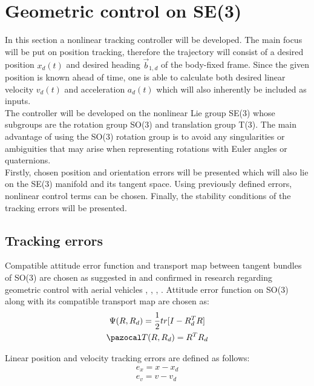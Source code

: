 \section{Geometric control on SE(3)}

In this section a nonlinear tracking controller will be developed. The main focus will be put on position tracking, therefore the trajectory will consist of a desired position $x_d(t)$ and desired heading $\vec{b}_{1,d}$ of the body-fixed frame. Since the given position is known ahead of time, one is able to calculate both desired linear velocity $v_d(t)$ and acceleration $a_d(t)$ which will also inherently be included as inputs. \\
The controller will be developed on the nonlinear Lie group SE(3) whose subgroups are the rotation group SO(3) and translation group T(3). The main advantage of using the SO(3) rotation group is to avoid any singularities or ambiguities that may arise when representing rotations with Euler angles or quaternions. \\
Firstly, chosen position and orientation errors will be presented which will also lie on the SE(3) manifold and its tangent space. Using previously defined errors, nonlinear control terms can be chosen. Finally, the stability conditions of the tracking errors will be presented.

\subsection{Tracking errors}

Compatible attitude error function and transport map between tangent bundles of SO(3) are chosen as suggested in \cite{bulloBook} and confirmed in research regarding geometric control with aerial vehicles \cite{LeeClanak1}, \cite{LeeClanak2}, \cite{LeeClanak3}, \cite{LeeClanak4}. Attitude error function on SO(3) along with its compatible transport map are chosen as:
\begin{gather}
	\Psi(R, R_d) = \frac{1}{2}tr[I - R_d^TR] \label{attErr} \\ 
	\Ta(R, R_d) = R^T R_d \label{transportMap}
\end{gather}

\noindent Linear position and velocity tracking errors are defined as follows:
\begin{gather}
	e_x = x - x_d \\
	e_v = v - v_d \label{linear_error}
\end{gather}

